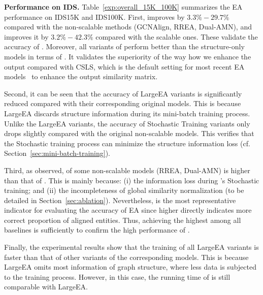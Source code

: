 \noindent
\textbf{Performance on IDS.}\label{sec:exp_ids}
Table~\ref{exp:overall_15K_100K} summarizes the EA performance on IDS15K and IDS100K.
First,  \ClusterEA{} improves \HitOne{} by   $3.3\%-29.7\%$ compared with the non-scalable methods (GCNAlign, RREA, Dual-AMN), and improves it by $3.2\%-42.3\%$ compared with the scalable ones. These validate the accuracy of \ClusterEA{}.
% 
Moreover, all variants of \ClusterEA{} perform better than the structure-only models in terms of \HitOne{}. It validates the superiority of the way how we enhance the output compared with CSLS, which is the default setting for most recent EA models~\cite{EVA20,EASY21, MRAEA20,RREA20, OpenEA2020VLDB, DualAMN21} to enhance the output similarity matrix. 

Second, it can be seen that the accuracy of LargeEA variants is significantly reduced compared with their corresponding original models. This is because LargeEA discards structure information during its mini-batch training process. Unlike the LargeEA variants, the accuracy of Stochastic Training variants only drops slightly compared with the original non-scalable models. This verifies that the Stochastic training process can minimize the structure information loss (cf. Section~\ref{sec:mini-batch-training}). 

Third, as observed,  \HitTen{} of some non-scalable models (RREA, Dual-AMN) is higher than that of \ClusterEA{}. This is mainly because: (i) the information loss during \ClusterEA{}'s Stochastic training; and (ii) the incompleteness of global similarity normalization (to be detailed in Section~\ref{sec:ablation}). Nevertheless, \HitOne{} is the most representative indicator for evaluating the accuracy of EA since higher \HitOne{} directly indicates more correct proportion of aligned entities. Thus, achieving the highest \HitOne{} among all baselines is sufficiently to confirm the high performance of \ClusterEA{}.

Finally, the experimental results show that the training of all LargeEA variants is faster than that of other variants of the corresponding models. This is because LargeEA omits most information of graph structure, where less data is subjected to the training process. However, in this case, the running time of \ClusterEA{} is still comparable with LargeEA.


